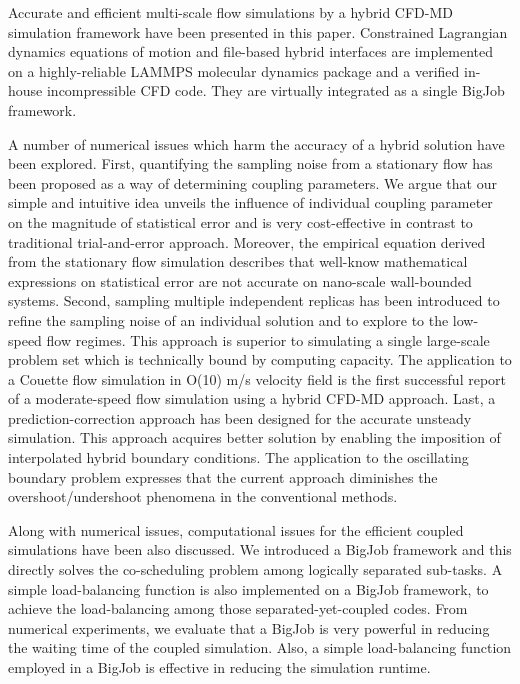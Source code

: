 \documentclass[preprint,12pt]{elsarticle}
\begin{document}
Accurate and efficient multi-scale flow simulations by a hybrid CFD-MD simulation framework have been presented in this paper. Constrained Lagrangian dynamics equations of motion and file-based hybrid interfaces are implemented on a highly-reliable LAMMPS molecular dynamics package and a verified in-house incompressible CFD code. They are virtually integrated as a single BigJob framework.

A number of numerical issues which harm the accuracy of a hybrid solution have been explored. First, quantifying the sampling noise from a stationary flow has been proposed as a way of determining coupling parameters. We argue that our simple and intuitive idea unveils the influence of individual coupling parameter on the magnitude of statistical error and is very cost-effective in contrast to traditional trial-and-error approach.
Moreover, the empirical equation derived from the stationary flow simulation describes that well-know mathematical expressions on statistical error are not accurate on nano-scale wall-bounded systems.
Second, sampling multiple independent replicas has been introduced to refine the sampling noise of an individual solution and to explore to the low-speed flow regimes. This approach is superior to simulating a single large-scale problem set which is technically bound by computing capacity. The application to a Couette flow simulation in O(10) m/s velocity field is the first successful report of a moderate-speed flow simulation using a hybrid CFD-MD approach.
Last, a prediction-correction approach has been designed for the accurate unsteady simulation. This approach acquires better solution by enabling the imposition of interpolated hybrid boundary conditions. The application to the oscillating boundary problem expresses that the current approach diminishes the overshoot/undershoot phenomena in the conventional methods.

Along with numerical issues, computational issues for the efficient coupled simulations have been also discussed. We introduced a BigJob framework and this directly solves the co-scheduling problem among logically separated sub-tasks. A simple load-balancing function is also implemented on a BigJob framework, to achieve the load-balancing among those separated-yet-coupled codes. From numerical experiments, we evaluate that a BigJob is very powerful in reducing the waiting time of the coupled simulation. Also, a simple load-balancing function employed in a BigJob is effective in reducing the simulation runtime.
\end{document}
